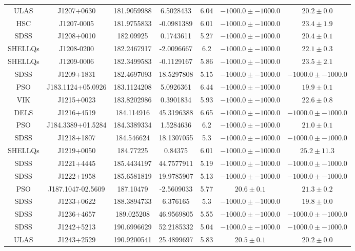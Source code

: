 \begin{table}
\begin{tabular}{ccccccc}
ULAS & J1207+0630 & 181.9059988 & 6.5028433 & 6.04 & $-1000.0\pm-1000.0$ & $  20.2\pm  0.0$ \\
HSC & J1207-0005 & 181.9755833 & -0.0981389 & 6.01 & $-1000.0\pm-1000.0$ & $  23.4\pm  1.9$ \\
SDSS & J1208+0010 & 182.09925 & 0.1743611 & 5.27 & $-1000.0\pm-1000.0$ & $  20.4\pm  0.1$ \\
SHELLQs & J1208-0200 & 182.2467917 & -2.0096667 & 6.2 & $-1000.0\pm-1000.0$ & $  22.1\pm  0.3$ \\
SHELLQs & J1209-0006 & 182.3499583 & -0.1129167 & 5.86 & $-1000.0\pm-1000.0$ & $  23.5\pm  2.1$ \\
SDSS & J1209+1831 & 182.4697093 & 18.5297808 & 5.15 & $-1000.0\pm-1000.0$ & $-1000.0\pm-1000.0$ \\
PSO & J183.1124+05.0926 & 183.1124208 & 5.0926361 & 6.44 & $-1000.0\pm-1000.0$ & $  19.9\pm  0.1$ \\
VIK & J1215+0023 & 183.8202986 & 0.3901834 & 5.93 & $-1000.0\pm-1000.0$ & $  22.6\pm  0.8$ \\
DELS & J1216+4519 & 184.114916 & 45.3196388 & 6.65 & $-1000.0\pm-1000.0$ & $-1000.0\pm-1000.0$ \\
PSO & J184.3389+01.5284 & 184.3389334 & 1.5284636 & 6.2 & $-1000.0\pm-1000.0$ & $  21.0\pm  0.1$ \\
SDSS & J1218+1807 & 184.546624 & 18.1307055 & 5.3 & $-1000.0\pm-1000.0$ & $-1000.0\pm-1000.0$ \\
SHELLQs & J1219+0050 & 184.77225 & 0.84375 & 6.01 & $-1000.0\pm-1000.0$ & $  25.2\pm 11.3$ \\
SDSS & J1221+4445 & 185.4434197 & 44.7577911 & 5.19 & $-1000.0\pm-1000.0$ & $-1000.0\pm-1000.0$ \\
SDSS & J1222+1958 & 185.6581819 & 19.9785907 & 5.13 & $-1000.0\pm-1000.0$ & $-1000.0\pm-1000.0$ \\
PSO & J187.1047-02.5609 & 187.10479 & -2.5609033 & 5.77 & $  20.6\pm  0.1$ & $  21.3\pm  0.2$ \\
SDSS & J1233+0622 & 188.3894733 & 6.376165 & 5.3 & $-1000.0\pm-1000.0$ & $  19.8\pm  0.0$ \\
SDSS & J1236+4657 & 189.025208 & 46.9569805 & 5.55 & $-1000.0\pm-1000.0$ & $-1000.0\pm-1000.0$ \\
SDSS & J1242+5213 & 190.6996629 & 52.2185332 & 5.04 & $-1000.0\pm-1000.0$ & $-1000.0\pm-1000.0$ \\
ULAS & J1243+2529 & 190.9200541 & 25.4899697 & 5.83 & $  20.5\pm  0.1$ & $  20.2\pm  0.0$ \\

\end{tabular}
\end{table}
